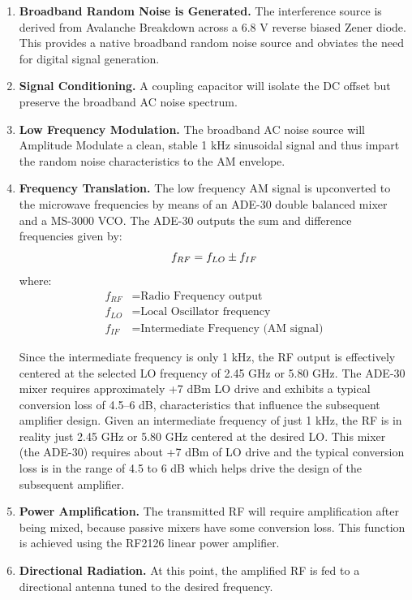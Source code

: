 \documentclass[12pt,a4paper]{report}
\begin{document}
		\begin{enumerate}
			\item \textbf{Broadband Random Noise is Generated.} The interference source is derived from Avalanche Breakdown across a 6.8 V reverse biased Zener diode. This provides a native broadband random noise source and obviates the need for digital signal generation.
			
			\item \textbf{Signal Conditioning.} A coupling capacitor will isolate the DC offset but preserve the broadband AC noise spectrum.
			
			\item \textbf{Low Frequency Modulation.} The broadband AC noise source will Amplitude Modulate a clean, stable 1 kHz sinusoidal signal and thus impart the random noise characteristics to the AM envelope.
			
			\item \textbf{Frequency Translation.} The low frequency AM signal is upconverted to the microwave frequencies by means of an ADE-30 double balanced mixer and a MS-3000 VCO. The ADE-30 outputs the sum and difference frequencies given by:
			\begingroup
			\setlength{\mathindent}{0pt}
			\begin{equation*}
				\hfill
				f_{RF}=f_{LO}\pm f_{IF}
				\hfill
			\end{equation*}
			\endgroup
				where:
			\begin{align*}
				f_{RF} &= \text{Radio Frequency output} \\
				f_{LO} &= \text{Local Oscillator frequency} \\
				f_{IF} &= \text{Intermediate Frequency (AM signal)}
			\end{align*}
					
			Since the intermediate frequency is only 1 kHz, the RF output is effectively centered at the selected LO frequency of 2.45 GHz or 5.80 GHz. The ADE-30 mixer requires approximately +7 dBm LO drive and exhibits a typical conversion loss of 4.5--6 dB, characteristics that influence the subsequent amplifier design. Given an intermediate frequency of just 1 kHz, the RF is in reality just 2.45 GHz or 5.80 GHz centered at the desired LO. This mixer (the ADE-30) requires about +7 dBm of LO drive and the typical conversion loss is in the range of 4.5 to 6 dB which helps drive the design of the subsequent amplifier.
			
			\item \textbf{Power Amplification.} The transmitted RF will require amplification after being mixed, because passive mixers have some conversion loss. This function is achieved using the RF2126 linear power amplifier.
			
			\item \textbf{Directional Radiation.} At this point, the amplified RF is fed to a directional antenna tuned to the desired frequency.
		\end{enumerate}
		
\end{document}
